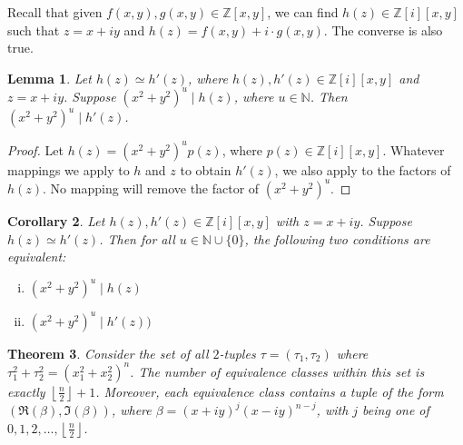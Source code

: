 \documentclass[12pt]{article}
\newtheorem{theorem}{Theorem}[section]
\newtheorem{lemma}[theorem]{Lemma}
\newtheorem{corollary}[theorem]{Corollary}
\theoremstyle{definition}
\newcommand{\Nnn}{\mathbb N}
\newcommand{\Zzz}{\mathbb Z}
\newcommand{\vanish}[1]{}
\newcommand{\divides}{\mid}
\numberwithin{equation}{section}
\begin{document}
Recall that given \( f(x,y), g(x,y) \in \Zzz[x,y] \),
we can find \( h(z) \in \Zzz [i][x,y] \)
such that
\( z = x + iy \)
and
\( h(z) = f(x,y) + i \cdot g(x,y) \). 
The converse is also true.


\begin{lemma}
Let \( h(z) \simeq h'(z) \), where \( h(z), h'(z) \in \Zzz[i][x,y] \)
and \( z = x+ iy \).
Suppose \( ( x^2 + y^2 ) ^ u \divides h(z) \),
where \( u \in \Nnn \). Then \( ( x^2 + y^2 ) ^ u \divides h'(z) \).
\end{lemma}
   
\begin{proof}
Let \( h(z) = ( x^2 + y^2 ) ^ u  p(z) \), where \( p(z) \in \Zzz [i][x,y] \). 
Whatever mappings we apply to \(h\) and \(z\)
to obtain \( h'(z) \), we also apply to the factors of \( h(z) \). 
No mapping will remove the factor of \( ( x^2 + y^2 ) ^ u \).

\end{proof}

\vanish{
\begin{corollary}
Let \( h(z), h'(z) \in \Zzz[i][x,y] \) with \( z = x+ iy \).
\[
h(z) \simeq h'(z) 
\implies 
( \forall u \in \Nnn \cup \{ 0 \},  ( x^2 + y^2 ) ^ u \divides h(z)  \iff ( x^2 + y^2 ) ^ u \divides h'(z)  )
\]
\end{corollary}
}

\begin{corollary}
\label{corollary_equivalence}
Let \( h(z), h'(z) \in \Zzz[i][x,y] \) with \( z = x+ iy \).
Suppose \( h(z) \simeq h'(z) \). Then for all  \( u \in \Nnn \cup \{ 0 \} \),
the following two conditions are
equivalent:
\begin{enumerate}[i.]
\item \( ( x^2 + y^2 ) ^ u \divides h(z) \)
\item \( ( x^2 + y^2 ) ^ u \divides h'(z)  ) \)
\end{enumerate}
\end{corollary}




\begin{theorem}
Consider the set of all \(2\)-tuples \( \tau = ( \tau_1, \tau_2 )\) where 
\(
  \tau_1 ^ 2   +   \tau_2 ^ 2   
= 
\left(  x_1 ^ 2 + x_2 ^ 2  \right) ^ n 
\).
The number of equivalence classes within this set 
is exactly  \( \left\lfloor \frac{n}{2} \right\rfloor + 1 \). 
Moreover, each equivalence class contains a tuple
of the form \( ( \Re( \beta ) , \Im( \beta ) ) \),
where \( \beta = (x + iy)^j (x -  iy)^{n-j} \),
with \( j \)
being one of \( 0, 1, 2, \ldots, \left\lfloor \frac{n}{2} \right\rfloor \).
\end{theorem}
\end{document}
